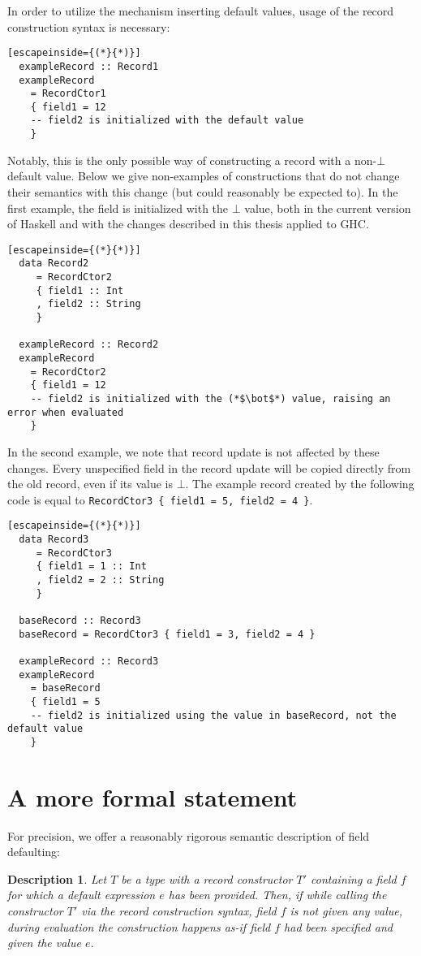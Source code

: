 \documentclass[en]{pracamgr}
\begin{document}
In order to utilize the mechanism inserting default values, usage of the record construction syntax is necessary:

\begin{lstlisting}[escapeinside={(*}{*)}]
  exampleRecord :: Record1
  exampleRecord 
    = RecordCtor1
    { field1 = 12
    -- field2 is initialized with the default value
    }
\end{lstlisting}

Notably, this is the only possible way of constructing a record with a non-$\bot$ default value.
Below we give non-examples of constructions that do not change their semantics with this change (but could reasonably be expected to).
In the first example, the field is initialized with the $\bot$ value, both in the current version of Haskell and with the changes described in this thesis applied to GHC.

\begin{lstlisting}[escapeinside={(*}{*)}]
  data Record2
     = RecordCtor2 
     { field1 :: Int
     , field2 :: String
     }  

  exampleRecord :: Record2
  exampleRecord 
    = RecordCtor2 
    { field1 = 12
    -- field2 is initialized with the (*$\bot$*) value, raising an error when evaluated
    }

\end{lstlisting}

In the second example, we note that record update is not affected by these changes. 
Every unspecified field in the record update will be copied directly from the old record, even if its value is $\bot$.
The example record created by the following code is equal to \texttt{RecordCtor3 \{ field1 = 5, field2 = 4 \}}.

\begin{lstlisting}[escapeinside={(*}{*)}]
  data Record3
     = RecordCtor3
     { field1 = 1 :: Int
     , field2 = 2 :: String
     }  

  baseRecord :: Record3
  baseRecord = RecordCtor3 { field1 = 3, field2 = 4 }

  exampleRecord :: Record3
  exampleRecord 
    = baseRecord
    { field1 = 5
    -- field2 is initialized using the value in baseRecord, not the default value
    }

\end{lstlisting}

\section{A more formal statement}
For precision, we offer a reasonably rigorous semantic description of field defaulting:
\newtheorem{remark}{Description}
\begin{remark}
  \normalfont
  Let $T$ be a type with a record constructor $T'$ containing a field $f$ for which a default expression $e$ has been provided.
  Then, if while calling the constructor $T'$ via the record construction syntax, field $f$ is not given any value, during evaluation the construction happens \textit{as-if} field $f$ had been specified and given the value $e$.
\end{remark}
\end{document}
